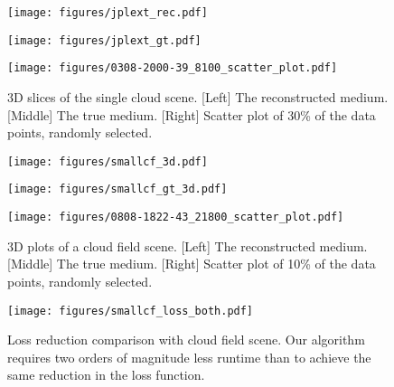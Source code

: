 \documentclass{article}
\begin{document}

\begin{figure}[b!]
  \centering
  \begin{minipage}[b]{0.4\textwidth}
  \texttt{[image: figures/jplext\_rec.pdf]}
  \end{minipage}
    \begin{minipage}[b]{0.3\textwidth}
  \texttt{[image: figures/jplext\_gt.pdf]}
  \end{minipage}
      \begin{minipage}[b]{0.28\textwidth}
  \texttt{[image: figures/0308-2000-39\_8100\_scatter\_plot.pdf]}
  \end{minipage}
    \caption{3D slices of the single cloud scene. [Left] The reconstructed medium. [Middle] The true medium. [Right] Scatter plot of 30\% of the data points, randomly selected.}
    \label{fig:cloud_plane}
\end{figure}

\begin{figure}
  \centering
  \begin{minipage}[b]{0.4\textwidth}
  \texttt{[image: figures/smallcf\_3d.pdf]}
  \end{minipage}
    \begin{minipage}[b]{0.335\textwidth}
  \texttt{[image: figures/smallcf\_gt\_3d.pdf]}
  \end{minipage}
      \begin{minipage}[b]{0.245\textwidth}
  \texttt{[image: figures/0808-1822-43\_21800\_scatter\_plot.pdf]}
  \end{minipage}
    \caption{3D plots of a cloud field scene. [Left] The reconstructed medium. [Middle] The true medium. [Right] Scatter plot of 10\% of the data points, randomly selected.}
    \label{fig:cloud_3d}
\end{figure}

\begin{figure}[b!]
    \centering
   \texttt{[image: figures/smallcf\_loss\_both.pdf]}
    \caption{Loss reduction comparison with \citep{loeub2020monotonicity} cloud field scene. Our algorithm requires two orders of magnitude less runtime than \citep{loeub2020monotonicity} to achieve the same reduction in the loss function.}
    \label{fig:loss_reduction_comparison}
\end{figure}
\end{document}
